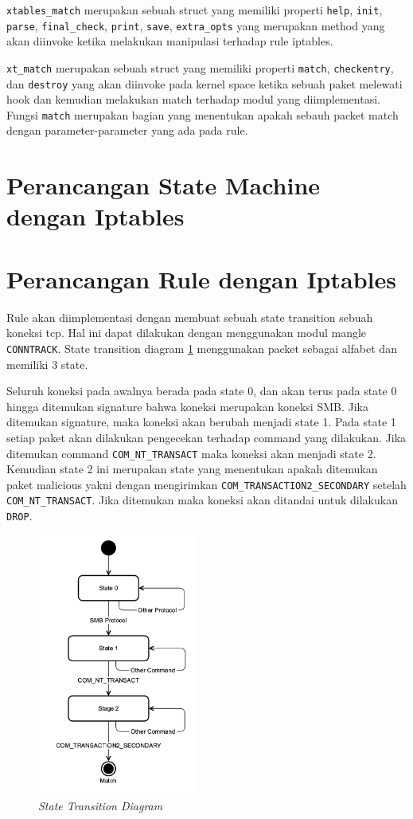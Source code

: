 \verb|xtables_match| merupakan sebuah struct yang memiliki properti \verb|help|, \verb|init|, \verb|parse|, \verb|final_check|, \verb|print|, \verb|save|, \verb|extra_opts| yang merupakan method yang akan diinvoke ketika melakukan manipulasi terhadap rule iptables.

\verb|xt_match| merupakan sebuah struct yang memiliki properti \verb|match|, \verb|checkentry|, dan \verb|destroy| yang akan diinvoke pada kernel space ketika sebuah paket melewati hook dan kemudian melakukan match terhadap modul yang diimplementasi. Fungsi \verb|match| merupakan bagian yang menentukan apakah sebauh packet match dengan parameter-parameter yang ada pada rule.

\section{Perancangan State Machine dengan Iptables}



\section{Perancangan Rule dengan Iptables}

Rule akan diimplementasi dengan membuat sebuah state transition sebuah koneksi tcp. Hal ini dapat dilakukan dengan menggunakan modul mangle \verb|CONNTRACK|. State transition diagram \ref{fig:state_transition_diagram} menggunakan packet sebagai alfabet dan memiliki 3 state.

Seluruh koneksi pada awalnya berada pada state 0, dan akan terus pada state 0 hingga ditemukan signature bahwa koneksi merupakan koneksi SMB. Jika ditemukan signature, maka koneksi akan berubah menjadi state 1. Pada state 1 setiap paket akan dilakukan pengecekan terhadap command yang dilakukan. Jika ditemukan command \verb|COM_NT_TRANSACT| maka koneksi akan menjadi state 2. Kemudian state 2 ini merupakan state yang menentukan apakah ditemukan paket malicious yakni dengan mengirimkan \verb|COM_TRANSACTION2_SECONDARY| setelah \verb|COM_NT_TRANSACT|. Jika ditemukan maka koneksi akan ditandai untuk dilakukan \verb|DROP|.

\begin{figure}[H]
	\centering
	\includegraphics[width=200px]{resources/ngfilter_state_diagram.png}
	\caption{\textit{State Transition Diagram}}
	\label{fig:state_transition_diagram}
\end{figure}

